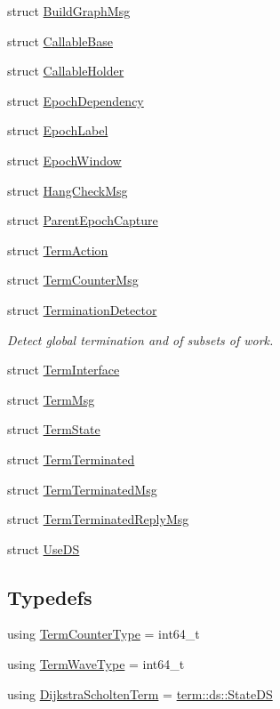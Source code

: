 \begin{DoxyCompactItemize}
\item 
struct \hyperlink{structvt_1_1term_1_1_build_graph_msg}{Build\+Graph\+Msg}
\item 
struct \hyperlink{structvt_1_1term_1_1_callable_base}{Callable\+Base}
\item 
struct \hyperlink{structvt_1_1term_1_1_callable_holder}{Callable\+Holder}
\item 
struct \hyperlink{structvt_1_1term_1_1_epoch_dependency}{Epoch\+Dependency}
\item 
struct \hyperlink{structvt_1_1term_1_1_epoch_label}{Epoch\+Label}
\item 
struct \hyperlink{structvt_1_1term_1_1_epoch_window}{Epoch\+Window}
\item 
struct \hyperlink{structvt_1_1term_1_1_hang_check_msg}{Hang\+Check\+Msg}
\item 
struct \hyperlink{structvt_1_1term_1_1_parent_epoch_capture}{Parent\+Epoch\+Capture}
\item 
struct \hyperlink{structvt_1_1term_1_1_term_action}{Term\+Action}
\item 
struct \hyperlink{structvt_1_1term_1_1_term_counter_msg}{Term\+Counter\+Msg}
\item 
struct \hyperlink{structvt_1_1term_1_1_termination_detector}{Termination\+Detector}
\begin{DoxyCompactList}\small\item\em Detect global termination and of subsets of work. \end{DoxyCompactList}\item 
struct \hyperlink{structvt_1_1term_1_1_term_interface}{Term\+Interface}
\item 
struct \hyperlink{structvt_1_1term_1_1_term_msg}{Term\+Msg}
\item 
struct \hyperlink{structvt_1_1term_1_1_term_state}{Term\+State}
\item 
struct \hyperlink{structvt_1_1term_1_1_term_terminated}{Term\+Terminated}
\item 
struct \hyperlink{structvt_1_1term_1_1_term_terminated_msg}{Term\+Terminated\+Msg}
\item 
struct \hyperlink{structvt_1_1term_1_1_term_terminated_reply_msg}{Term\+Terminated\+Reply\+Msg}
\item 
struct \hyperlink{structvt_1_1term_1_1_use_d_s}{Use\+DS}
\end{DoxyCompactItemize}
\subsection*{Typedefs}
\begin{DoxyCompactItemize}
\item 
using \hyperlink{namespacevt_1_1term_a4fd378cdb0c36683afc1b3399d685f7f}{Term\+Counter\+Type} = int64\+\_\+t
\item 
using \hyperlink{namespacevt_1_1term_a4af17606966b2b5a6cba523bc39095a3}{Term\+Wave\+Type} = int64\+\_\+t
\item 
using \hyperlink{namespacevt_1_1term_a886197ad3670cebba77f6b87ca59b4c9}{Dijkstra\+Scholten\+Term} = \hyperlink{structvt_1_1term_1_1ds_1_1_state_d_s}{term\+::ds\+::\+State\+DS}
\end{DoxyCompactItemize}
